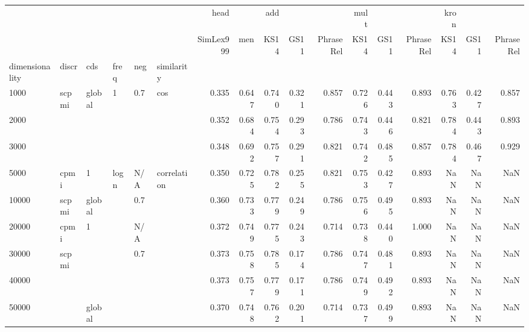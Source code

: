 \begin{tabular}{llllllrrrrrrrrrrr}
\toprule
      &      &   &   &     &             &      head &        &    add &        &           &   mult &        &           &   kron &        &           \\
      &      &   &   &     &             & SimLex999 &    men &   KS14 &   GS11 & PhraseRel &   KS14 &   GS11 & PhraseRel &   KS14 &   GS11 & PhraseRel \\
dimensionality & discr & cds & freq & neg & similarity &           &        &        &        &           &        &        &           &        &        &           \\
\midrule
1000  & scpmi & global & 1 & 0.7 & cos &     0.335 &  0.647 &  0.740 &  0.321 &     0.857 &  0.726 &  0.443 &     0.893 &  0.763 &  0.427 &     0.857 \\
2000  &      &   &   &     &             &     0.352 &  0.684 &  0.754 &  0.293 &     0.786 &  0.743 &  0.446 &     0.821 &  0.784 &  0.443 &     0.893 \\
3000  &      &   &   &     &             &     0.348 &  0.692 &  0.757 &  0.291 &     0.821 &  0.742 &  0.485 &     0.857 &  0.784 &  0.467 &     0.929 \\
5000  & cpmi & 1 & logn & N/A & correlation &     0.350 &  0.725 &  0.782 &  0.255 &     0.821 &  0.753 &  0.427 &     0.893 &    NaN &    NaN &       NaN \\
10000 & scpmi & global &   & 0.7 &             &     0.360 &  0.733 &  0.779 &  0.249 &     0.786 &  0.756 &  0.495 &     0.893 &    NaN &    NaN &       NaN \\
20000 & cpmi & 1 &   & N/A &             &     0.372 &  0.749 &  0.775 &  0.243 &     0.714 &  0.738 &  0.440 &     1.000 &    NaN &    NaN &       NaN \\
30000 & scpmi &   &   & 0.7 &             &     0.373 &  0.758 &  0.785 &  0.174 &     0.786 &  0.747 &  0.481 &     0.893 &    NaN &    NaN &       NaN \\
40000 &      &   &   &     &             &     0.373 &  0.757 &  0.779 &  0.171 &     0.786 &  0.749 &  0.492 &     0.893 &    NaN &    NaN &       NaN \\
50000 &      & global &   &     &             &     0.370 &  0.748 &  0.762 &  0.201 &     0.714 &  0.737 &  0.499 &     0.893 &    NaN &    NaN &       NaN \\
\bottomrule
\end{tabular}
